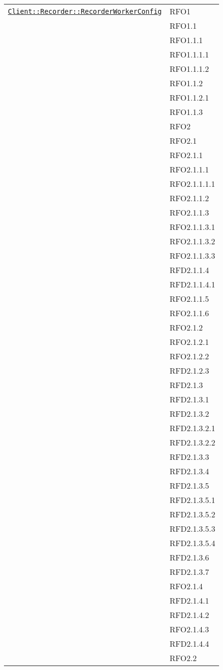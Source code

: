 \begin{longtable}{|>{\centering}m{10cm}|m{3cm}<{\centering}|}
\hyperref[Client::Recorder::RecorderWorkerConfig]{\texttt{Client::Recorder::RecorderWorkerConfig}} & RFO1\\
& RFO1.1\\
& RFO1.1.1\\
& RFO1.1.1.1\\
& RFO1.1.1.2\\
& RFO1.1.2\\
& RFO1.1.2.1\\
& RFO1.1.3\\
& RFO2\\
& RFO2.1\\
& RFO2.1.1\\
& RFO2.1.1.1\\
& RFO2.1.1.1.1\\
& RFO2.1.1.2\\
& RFO2.1.1.3\\
& RFO2.1.1.3.1\\
& RFO2.1.1.3.2\\
& RFO2.1.1.3.3\\
& RFD2.1.1.4\\
& RFD2.1.1.4.1\\
& RFO2.1.1.5\\
& RFO2.1.1.6\\
& RFO2.1.2\\
& RFO2.1.2.1\\
& RFO2.1.2.2\\
& RFD2.1.2.3\\
& RFD2.1.3\\
& RFD2.1.3.1\\
& RFD2.1.3.2\\
& RFD2.1.3.2.1\\
& RFD2.1.3.2.2\\
& RFD2.1.3.3\\
& RFD2.1.3.4\\
& RFD2.1.3.5\\
& RFD2.1.3.5.1\\
& RFD2.1.3.5.2\\
& RFD2.1.3.5.3\\
& RFD2.1.3.5.4\\
& RFD2.1.3.6\\
& RFD2.1.3.7\\
& RFO2.1.4\\
& RFD2.1.4.1\\
& RFD2.1.4.2\\
& RFO2.1.4.3\\
& RFD2.1.4.4\\
& RFO2.2\\

\end{longtable}
